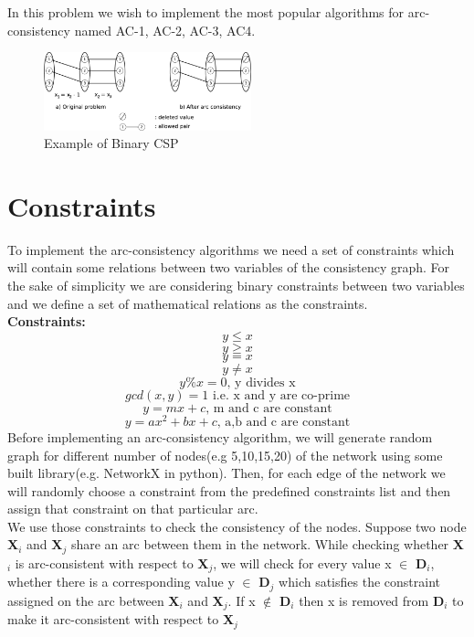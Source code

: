 \documentclass[conference]{IEEEtran}
\begin{document}
\noindent In this problem we wish to implement the most popular algorithms for arc-consistency named AC-1, AC-2, AC-3, AC4.
	\begin{figure}[h]
	\centering
			\includegraphics[width=6cm]{pic2.png}
			\captionsetup{singlelinecheck = false, format= hang,  font=footnotesize, labelsep=space}
			\caption{Example of Binary CSP}
\end{figure}
\section{Constraints}\noindent To implement the arc-consistency algorithms we need a set of constraints which will contain some relations between two variables of the consistency graph. For the sake of simplicity we are considering binary constraints between two variables and we define a set of mathematical relations as the constraints.\\\textbf{Constraints:}
\begin{equation}
y \leq x
\end{equation}
\begin{equation}
y \geq x
\end{equation}
\begin{equation}
y=x
\end{equation}
\begin{equation}
y \neq x
\end{equation}
\begin{equation}
y\%x=0 \mbox{, y divides x}
\end{equation}
\begin{equation}
gcd(x,y)=1 \mbox{ i.e. x and y are co-prime}
\end{equation}
\begin{equation}
y=mx + c \mbox{, m and c are constant}
\end{equation}
\begin{equation}
y=ax^2 + bx + c \mbox{, a,b and c are constant}
\end{equation}
\noindent Before implementing an arc-consistency algorithm, we will generate random graph for different number of nodes(e.g 5,10,15,20) of the network using some built library(e.g. NetworkX in python). Then, for each edge of the network we will randomly choose a constraint from the predefined constraints list and then assign that constraint on that particular arc.\\
\noindent We use those constraints to check the consistency of the nodes. Suppose two node \textbf{X$_i$} and \textbf{X$_j$} share an arc between them in the network. While checking whether \textbf{X$_i$} is arc-consistent with respect to \textbf{X$_j$}, we will check for every value x $\in$ \textbf{D$_i$}, whether there is a corresponding value y $\in$ \textbf{D$_j$} which satisfies the constraint assigned on the arc between \textbf{X$_i$} and \textbf{X$_j$}. If x $\notin$ \textbf{D$_i$} then x is removed from \textbf{D$_i$} to make it arc-consistent with respect to \textbf{X$_j$}
\end{document}
